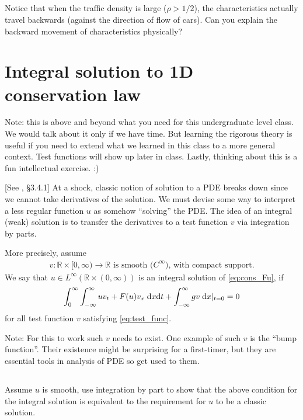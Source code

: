\documentclass[11pt,letterpaper]{report}
\begin{document}
\subsection{}
Notice that when the traffic density is large ($\rho>1/2$), the characteristics actually travel backwards (against the direction of flow of cars). Can you explain the backward movement of characteristics physically?

\section{Integral solution to 1D conservation law}
Note: this is above and beyond what you need for this undergraduate level class. We would talk about it only if we have time. But learning the rigorous theory is useful if you need to extend what we learned in this class to a more general context. Test functions will show up later in class. Lastly, thinking about this is a fun intellectual exercise. :)

[See \cite{Evans_10}, \S 3.4.1] At a shock, classic notion of solution to a PDE breaks down since we cannot take derivatives of the solution. We must devise some way to interpret a less regular function $u$ as somehow ``solving'' the PDE. The idea of an integral (weak) solution is to transfer the derivatives to a test function $v$ via integration by parts. 

More precisely, assume
\begin{align}
    v: \mathbb{R}\times[0,\infty)\to\mathbb{R} \text{ is smooth ($C^\infty$), with compact support}.\label{eq:test_func}
\end{align}
We say that $u\in L^\infty(\mathbb{R}\times(0,\infty))$ is an integral solution of \eqref{eq:cons_Fu}, if
\begin{align}
    \int^\infty_0\int^\infty_{-\infty} uv_t+F(u)v_x\;\mathrm{d} x\mathrm{d} t+\int^\infty_{-\infty} gv\;\mathrm{d} x|_{t=0} = 0
\end{align}
for all test function $v$ satisfying \eqref{eq:test_func}.

Note: For this to work such $v$ needs to exist. One example of such $v$ is the ``bump function''. Their existence might be surprising for a first-timer, but they are essential tools in analysis of PDE so get used to them.

\subsection{}
Assume $u$ is smooth, use integration by part to show that the above condition for the integral solution is equivalent to the requirement for $u$ to be a classic solution.
\end{document}
